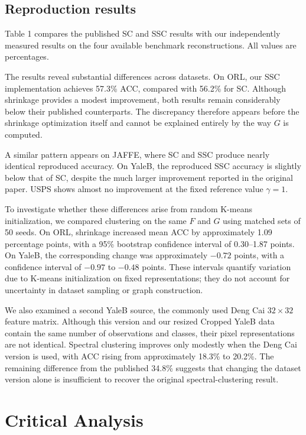 \documentclass{article}
\begin{document}
\subsection{Reproduction results}

Table 1 compares the published SC and SSC results with our independently measured results on the four available benchmark reconstructions. All values are percentages.



The results reveal substantial differences across datasets. On ORL, our SSC implementation achieves 57.3\% ACC, compared with 56.2\% for SC. Although shrinkage provides a modest improvement, both results remain considerably below their published counterparts. The discrepancy therefore appears before the shrinkage optimization itself and cannot be explained entirely by the way \(G\) is computed.

A similar pattern appears on JAFFE, where SC and SSC produce nearly identical reproduced accuracy. On YaleB, the reproduced SSC accuracy is slightly below that of SC, despite the much larger improvement reported in the original paper. USPS shows almost no improvement at the fixed reference value \(\gamma=1\).

To investigate whether these differences arise from random K-means initialization, we compared clustering on the same \(F\) and \(G\) using matched sets of 50 seeds. On ORL, shrinkage increased mean ACC by approximately 1.09 percentage points, with a 95\% bootstrap confidence interval of 0.30--1.87 points. On YaleB, the corresponding change was approximately $-0.72$ points, with a confidence interval of $-0.97$ to $-0.48$ points. These intervals quantify variation due to K-means initialization on fixed representations; they do not account for uncertainty in dataset sampling or graph construction.

We also examined a second YaleB source, the commonly used Deng Cai \(32\times32\) feature matrix. Although this version and our resized Cropped YaleB data contain the same number of observations and classes, their pixel representations are not identical. Spectral clustering improves only modestly when the Deng Cai version is used, with ACC rising from approximately 18.3\% to 20.2\%. The remaining difference from the published 34.8\% suggests that changing the dataset version alone is insufficient to recover the original spectral-clustering result.

\section{Critical Analysis}
\end{document}
